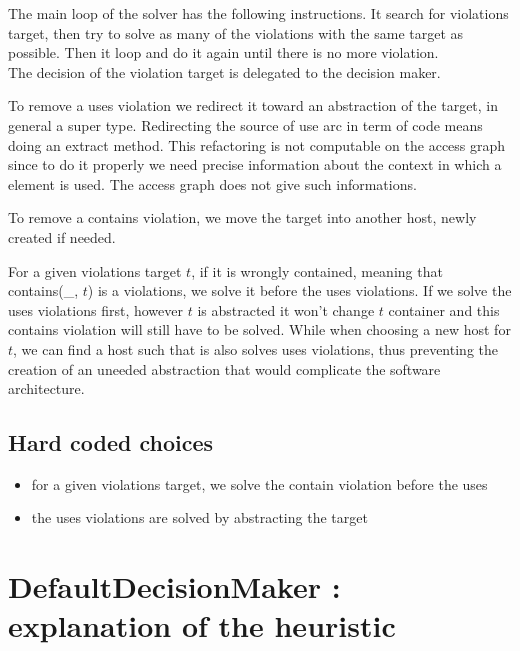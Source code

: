 \documentclass[]{article}
\begin{document}
The main loop of the solver has the following instructions. It search for violations target, then try to solve as many of the violations with the same target as possible. Then it loop and do it again until there is no more violation.\\

The decision of the violation target is delegated to the decision maker.

To remove a uses violation we redirect it toward an abstraction of the target, in general a super type. Redirecting the source of use arc in term of code means doing an extract method. This refactoring is not computable on the access graph since to do it properly we need precise information about the context in which a element is used. The access graph does not give such informations.

To remove a contains violation, we move the target into another host, newly created if needed.

For a given violations target $t$, if it is wrongly contained, meaning that contains(\_, $t$) is a violations, we solve it before the uses violations.
If we solve the uses violations first, however $t$ is abstracted it won't change $t$ container and this contains violation will still have to be solved.
While when choosing a new host for $t$, we can find a host such that is also solves uses violations, thus preventing the creation of an uneeded abstraction that would complicate the software architecture.





\subsection{Hard coded choices}
\begin{itemize}
	\item for a given violations target, we solve the contain violation before the uses
	\item the uses violations are solved by abstracting the target
\end{itemize}


\section{DefaultDecisionMaker : explanation of the heuristic }






\end{document}
